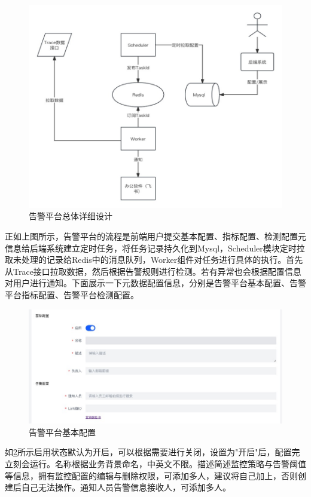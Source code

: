     \begin{figure}[htb]
  \centering
  \includegraphics[width=5in]{figure/chapter4/告警平台总体详细设计.jpg}
  \caption{告警平台总体详细设计}\label{gaojingzongti}
\end{figure}

正如上图所示，告警平台的流程是前端用户提交基本配置、指标配置、检测配置元信息给后端系统建立定时任务，将任务记录持久化到Mysql，Scheduler模块定时拉取未处理的记录给Redis中的消息队列，Worker组件对任务进行具体的执行。首先从Trace接口拉取数据，然后根据告警规则进行检测。若有异常也会根据配置信息对用户进行通知。下面展示一下元数据配置信息，分别是告警平台基本配置、告警平台指标配置、告警平台检测配置。

\begin{figure}[htb]
  \centering
  \includegraphics[width=5in]{figure/chapter4/告警平台基本配置.jpg}
  \caption{告警平台基本配置}\label{gaojingjiben}
\end{figure}

如\ref{gaojingjiben}所示启用状态默认为开启，可以根据需要进行关闭，设置为"开启"后，配置完立刻会运行。名称根据业务背景命名，中英文不限。描述简述监控策略与告警阈值等信息，拥有监控配置的编辑与删除权限，可添加多人，建议将自己加上，否则创建后自己无法操作。通知人员告警信息接收人，可添加多人。

